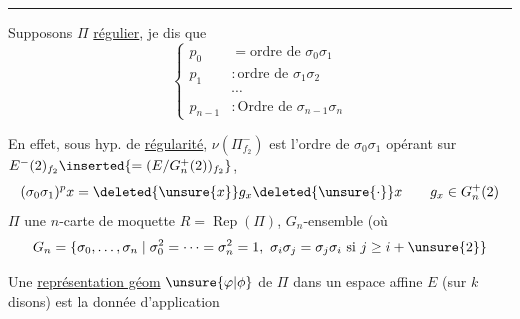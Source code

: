 \par\noindent\hspace*{.25\linewidth}\rule{.25\linewidth}{.4pt}\par

Supposons $\Pi$ \uline{régulier}, je dis que
\[
\left\{\begin{aligned}
p_0&=\text{ordre de }\sigma_0\sigma_1\\
p_1&:\text{ordre de }\sigma_1\sigma_2\\
&\cdots\\
p_{n-1}&:\text{Ordre de }\sigma_{n-1}\sigma_n
\end{aligned}\right.
\]

En effet, \deleted{\unsure{$\Pi$}} sous hyp. de \uline{régularité}, $\nu(\Pi^-_{f_2})$ est l'ordre de $\sigma_0\sigma_1$ opérant sur $E^-(2)_{f_2}\inserted{=(E/G_n^+(2))_{f_2}}$, 
\[
(\sigma_0\sigma_1)^p x=\deleted{\unsure{x}}g_x\deleted{\unsure{\cdot}}x\qquad g_x\in G_n^+(2)
\]
$\Pi$ une $n$-carte  de moquette $R=\operatorname{Rep}(\Pi)$, $G_n$-ensemble (où
\[
G_n=\{\sigma_0,\ldots,\sigma_n\mid\sigma_0^2=\cdots=\sigma_n^2=1,\ \sigma_i\sigma_j=\sigma_j\sigma_i\text{ si }j\geq i+\unsure{2}\}
\]

Une \uline{représentation géom} $\unsure{\varphi|\phi}$ de $\Pi$ dans  un espace affine $E$ (sur  $k$ disons) est la donnée d'application

